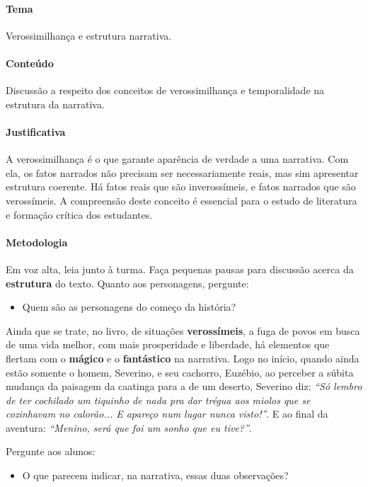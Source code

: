 \documentclass[11pt]{extarticle}
\begin{document}
\paragraph{Tema} Verossimilhança e estrutura narrativa.

\paragraph{Conteúdo} Discussão a respeito dos conceitos de verossimilhança 
e temporalidade na estrutura da narrativa.

\paragraph{Justificativa} A verossimilhança é o que garante aparência de 
verdade a uma narrativa. Com ela, os fatos narrados não precisam ser necessariamente
reais, mas sim apresentar estrutura coerente. Há fatos reais que são inverossímeis,
e fatos narrados que são verossímeis. A compreensão deste conceito é essencial para
o estudo de literatura e formação crítica dos estudantes.


\paragraph{Metodologia} Em voz alta, leia junto à turma. Faça pequenas pausas para discussão 
acerca da \textbf{estrutura} do texto. Quanto aos personagens, pergunte:

\begin{itemize}
\item Quem são as personagens do começo da história? 
\end{itemize}

Ainda que se trate, no livro, de situações \textbf{verossímeis}, a fuga de povos 
em busca de uma vida melhor, com mais prosperidade e liberdade, há elementos 
que flertam com o \textbf{mágico} e o \textbf{fantástico} na narrativa. Logo no início, quando 
ainda estão somente o homem, Severino, e seu cachorro, Euzébio, ao perceber a 
súbita mudança da paisagem da caatinga para a de um deserto, Severino diz: 
\textit{``Só lembro de ter cochilado um tiquinho de nada pra dar trégua aos miolos 
que se cozinhavam no calorão... E apareço num lugar nunca visto!''}. E ao final 
da aventura: \textit{``Menino, será que foi um sonho que eu tive?''}.

Pergunte aos alunos:

\begin{itemize}
	\item O que parecem indicar, na narrativa, essas duas observações?
\end{itemize}
\end{document}
